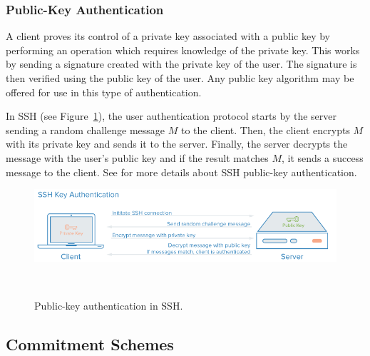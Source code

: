 \documentclass[10pt]{article}
\theoremstyle{plain}
\begin{document}
\subsubsection{Public-Key Authentication}

A client proves its control of a private key associated with a public
key by performing an operation which requires knowledge of the private
key. This works by sending a signature created with the private key
of the user. The signature is then verified using the public key of
the user. Any public key algorithm may be offered for use in this
type of authentication. 

In SSH (see Figure~\ref{fig:SSH-Auth}), the user authentication
protocol starts by the server sending a random challenge message $M$
to the client. Then, the client encrypts $M$ with its private key
and sends it to the server. Finally, the server decrypts the message
with the user's public key and if the result matches $M$, it sends
a success message to the client. See \cite{rfc4252} for more details
about SSH public-key authentication.

\begin{figure}
	\begin{description}
		\item [{\includegraphics[scale=0.7]{ssh-auth}}]~
	\end{description}
	\caption{Public-key authentication in SSH.}
	\label{fig:SSH-Auth}
\end{figure}


\subsection{Commitment Schemes }
\end{document}
